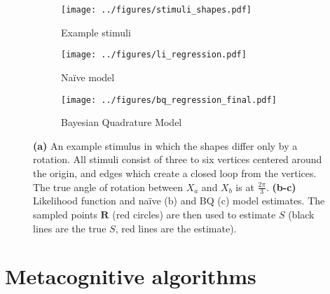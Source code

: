 \documentclass{article} %
\newcommand{\naive}[0]{na\"ive}
\newcommand{\Naive}[0]{Na\"ive}
\begin{document}
\begin{figure}[t]
  \centering
  \begin{subfigure}[b]{0.32\textwidth}
    \centering
    \texttt{[image: ../figures/stimuli\_shapes.pdf]}
    \vspace{0pt}
    \caption{Example stimuli}
    \label{fig:stimuli}
  \end{subfigure}
  \begin{subfigure}[b]{0.32\textwidth}
    \centering
    \texttt{[image: ../figures/li\_regression.pdf]}
    \caption{\Naive{} model}
    \label{fig:li}
  \end{subfigure}
  \begin{subfigure}[b]{0.32\textwidth}
    \centering
    \texttt{[image: ../figures/bq\_regression\_final.pdf]}
    \caption{Bayesian Quadrature Model}
    \vspace{0pt}
    \label{fig:bq}
  \end{subfigure}
  \caption{\textbf{(a)} An example stimulus in which the shapes differ
    only by a rotation. All stimuli consist of three to six vertices
    centered around the origin, and edges which create a closed loop
    from the vertices. The true angle of rotation between $X_a$ and
    $X_b$ is at $\frac{2\pi}{3}$. \textbf{(b-c)} Likelihood function
    and \naive{} (b) and BQ (c) model estimates. The sampled points
    $\mathbf{R}$ (red circles) are then used to estimate $S$ (black
    lines are the true $S$, red lines are the estimate).}
  \label{fig:shapes}
\end{figure}

\section{Metacognitive algorithms}
\end{document}
